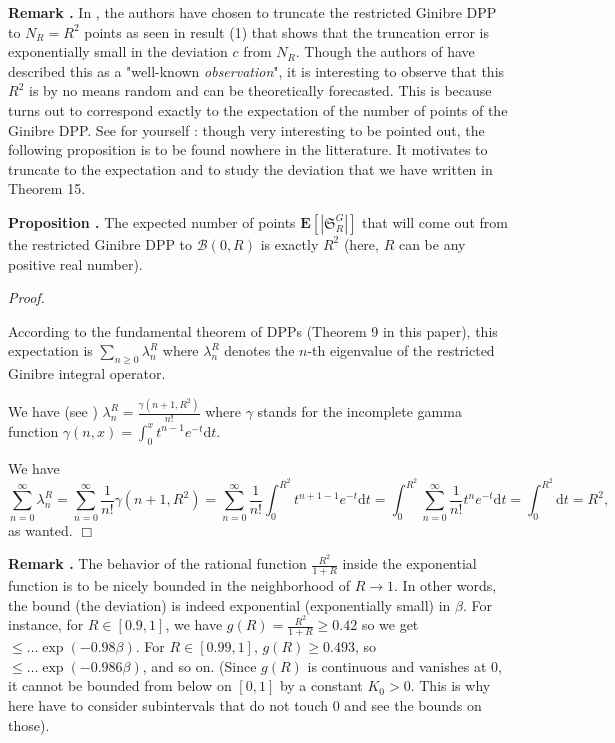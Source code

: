 \documentclass[11pt]{article}
\newcommand{\qed}{\hfill$\Box$}
\newcounter{cnt}
\newcommand{\cnt}{\thecnt \stepcounter{cnt}}
\begin{document}
\textbf{Remark \cnt.} In \cite{DecreusefondMoroz2021}, the authors have chosen to truncate the restricted Ginibre DPP to $N_R = R^2$ points as seen in result (1) that shows that the truncation error is exponentially small in the deviation $c$ from $N_R$. Though the authors of \cite{DecreusefondMoroz2021} have described this as a "well-known \textit{observation}", it is interesting to observe that this $R^2$ is by no means random and can be theoretically forecasted. This is because turns out to correspond exactly to the expectation of the number of points of the Ginibre DPP. See for yourself : though very interesting to be pointed out, the following proposition is to be found nowhere in the litterature. It motivates to truncate to the expectation and to study the deviation that we have written in Theorem 15.

\textbf{Proposition \cnt.} The expected number of points $\mathbf{E}[|\mathfrak{S}_R^G|]$ that will come out from the restricted Ginibre DPP to $\mathcal{B}(0,R)$ is exactly $R^2$ (here, $R$ can be any positive real number).

\textit{Proof.}

According to the fundamental theorem of DPPs (Theorem 9 in this paper), this expectation is $\sum\limits_{n \ge 0} \lambda_n^R$ where $\lambda_n^R$ denotes the $n$-th eigenvalue of the restricted Ginibre integral operator.

We have (see \cite{DecreusefondMoroz2021}) $\lambda_n^R = \frac{\gamma(n+1, R^2)}{n!}$ where $\gamma$ stands for the incomplete gamma function $\gamma(n,x) = \int_0^x t^{n-1}e^{-t} \mathrm dt$.

We have
\[
\sum_{n=0}^\infty \lambda_n^R = \sum_{n=0}^\infty \frac{1}{n!} \gamma(n+1, R^2) = \sum_{n=0}^\infty \frac{1}{n!} \int_0^{R^2} t^{n+1-1} e^{-t} \mathrm dt = \int_0^{R^2} \sum_{n=0}^\infty \frac{1}{n!} t^n e^{-t} \mathrm dt = \int_0^{R^2} \mathrm dt = R^2,
\]
as wanted. \qed

\textbf{Remark \cnt.} The behavior of the rational function $\frac{R^2}{1+R}$ inside the exponential function is to be nicely bounded in the neighborhood of $R \to 1$. In other words, the bound (the deviation) is indeed exponential (exponentially small) in $\beta$. For instance, for $R \in [0.9, 1]$, we have $g(R) = \frac{R^2}{1+R} \ge 0.42$ so we get $\le \dots \exp(-0.98\beta)$. For $R \in [0.99, 1]$, $g(R) \ge 0.493$, so $\le \dots \exp(-0.986\beta)$, and so on. (Since $g(R)$ is continuous and vanishes at 0, it cannot be bounded from below on $[0,1]$ by a constant $K_0 > 0$. This is why here have to consider subintervals that do not touch 0 and see the bounds on those).
\end{document}
